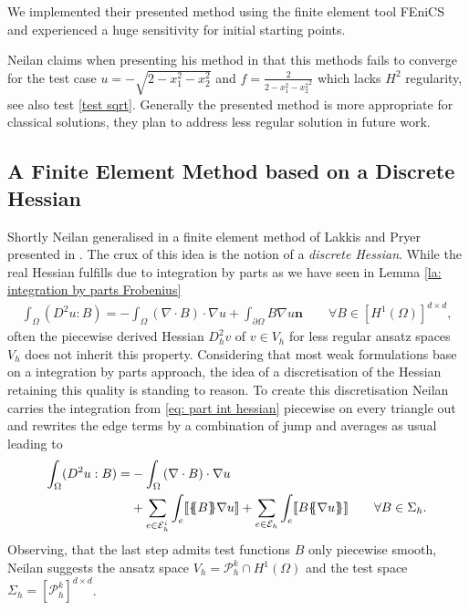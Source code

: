 We implemented their presented method using the finite element tool FEniCS \cite{FEniCS} and experienced a huge sensitivity for initial starting points.

Neilan claims when presenting his method in \cite{Neilan2014} that this methods fails to converge for the test case
$u = -\sqrt{2 - x_1^2 - x_2^2 }$ and $f = \frac 2 {{2 - x_1^2 - x_2^2}^2}$ which lacks $H^2$ regularity, see also test \ref{test sqrt}. Generally the presented method is more appropriate for classical solutions, they plan to address less regular solution in future work.


\subsection{A Finite Element Method based on a Discrete Hessian} \label{subsec: disrete Hessian} \label{sec: FEM discrete Hessian}

Shortly Neilan generalised in \cite{Neilan2014} a finite element method of Lakkis and Pryer presented in \cite{LP2011}.
The crux of this idea is the notion of a \emph{discrete Hessian}. 
While the real Hessian fulfills due to integration by parts as we have seen in Lemma \ref{la: integration by parts Frobenius}
	\begin{align}
		\int_\Omega (D^2 u : B) = - \int_\Omega \left(\nabla \cdot B\right) \cdot \nabla u + \int_{\partial \Omega}  B \nabla u \mathbf {n} \qquad \forall B \in [H^1(\Omega)]^{d \times d}, \label{eq: part int hessian}
	\end{align}
often the piecewise derived Hessian $D_h^2 v$ of $ v \in V_h$ for less regular ansatz spaces $V_h$ does not inherit this property. Considering that most weak formulations base on a integration by parts approach, the idea of a discretisation of the Hessian retaining this quality is standing to reason. To create this discretisation Neilan carries the integration from \eqref{eq: part int hessian} piecewise on every triangle out and rewrites the edge terms by a combination of jump and averages as usual leading to
	\begin{align}
		\begin{split}
		\int_\Omega (D^2 u : B) 
		=& - \int_\Omega \left(\nabla \cdot B\right) \cdot \nabla u \\
		&+ \sum_{ e \in \edgesi} \int_e  \jump {\average B \nabla u }
				+ \sum_{ e \in \edges} \int_e  \jump{B \average {\nabla u} }  \qquad \forall B \in \Sigma_h. \label{eq: part int hessian omega}
		\end{split}
	\end{align}
Observing, that the last step admits test functions $B$ only piecewise smooth, Neilan suggests the ansatz space $V_h = \mathcal{P}_h^k \cap H^1(\Omega)$ and the test space $\Sigma_h = [\mathcal{P}_h^k]^{d \times d}$.

